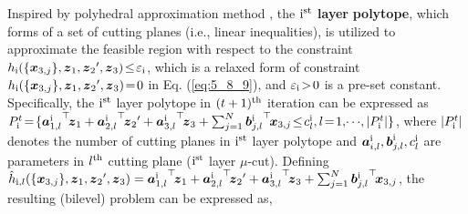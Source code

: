 \documentclass[letterpaper]{article} %
\begin{document}
Inspired by polyhedral approximation method \cite{bertsekas2015convex,burger2013polyhedral}, the \textbf{${\rm{\uppercase\expandafter{\romannumeral1}}}^{\rm{st}}$ layer} \textbf{polytope}, which forms of a set of cutting planes (i.e., linear inequalities), is utilized to approximate the feasible region with respect to the constraint $h_{\rm{\uppercase\expandafter{\romannumeral1}}}(\{{\boldsymbol{x}_{3,j}}\},\boldsymbol{z}_1, {\boldsymbol{z}_2}',\boldsymbol{z}_3 )\! \le \! \varepsilon_{\rm{\uppercase\expandafter{\romannumeral1}}}$, which is a relaxed form of constraint $h_{\rm{\uppercase\expandafter{\romannumeral1}}}(\{{\boldsymbol{x}_{3,j}}\},\boldsymbol{z}_1, {\boldsymbol{z}_2}',\boldsymbol{z}_3 )\!=\!0$ in Eq. (\ref{eq:5_8_9}), and $\varepsilon_{\rm{\uppercase\expandafter{\romannumeral1}}}\!>\!0$  is a pre-set constant. Specifically, the ${\rm{\uppercase\expandafter{\romannumeral1}}}^{\rm{st}}$ layer polytope in $(t+1)^{\rm{th}}$ iteration can be expressed as $P_{\rm{\uppercase\expandafter{\romannumeral1}}}^{t}\!=\!\{{\boldsymbol{a}_{1,l}^{\rm{\uppercase\expandafter{\romannumeral1}}}}^{\top}\!{\boldsymbol{z}_1} + {\boldsymbol{a}_{2,l}^{\rm{\uppercase\expandafter{\romannumeral1}}}}^{\top}\!{\boldsymbol{z}_2}' + {\boldsymbol{a}_{3,l}^{\rm{\uppercase\expandafter{\romannumeral1}}}}^{\top}\!{\boldsymbol{z}_3} + \sum\nolimits_{j = 1}^N {\boldsymbol{b}{{_{j,l}^{\rm{\uppercase\expandafter{\romannumeral1}}}}}}^{\top}\!{\boldsymbol{x}_{3,j}}  \!\le\! c_l^{\rm{\uppercase\expandafter{\romannumeral1}}},l \!=\! 1,\! \cdots\! ,|P_{\rm{\uppercase\expandafter{\romannumeral1}}}^{t}| \}$, where $|P_{\rm{\uppercase\expandafter{\romannumeral1}}}^{t}|$ denotes the number of cutting planes in ${\rm{\uppercase\expandafter{\romannumeral1}}}^{\rm{st}}$ layer polytope and ${\boldsymbol{a}_{i,l}^{\rm{\uppercase\expandafter{\romannumeral1}}}}, {\boldsymbol{b}_{j,l}^{\rm{\uppercase\expandafter{\romannumeral1}}}}, {c_{l}^{\rm{\uppercase\expandafter{\romannumeral1}}}}$ are parameters in $l^{\rm{th}}$ cutting plane (${\rm{\uppercase\expandafter{\romannumeral1}}}^{\rm{st}}$ layer $\mu$-cut). Defining $\hat{h}_{{\rm{\uppercase\expandafter{\romannumeral1}}},l}(\{{\boldsymbol{x}_{3,j}}\},\boldsymbol{z}_1, {\boldsymbol{z}_2}',\boldsymbol{z}_3 ) = {\boldsymbol{a}_{1,l}^{\rm{\uppercase\expandafter{\romannumeral1}}}}^{\top}\!{\boldsymbol{z}_1} + {\boldsymbol{a}_{2,l}^{\rm{\uppercase\expandafter{\romannumeral1}}}}^{\top}\!{\boldsymbol{z}_2}' + {\boldsymbol{a}_{3,l}^{\rm{\uppercase\expandafter{\romannumeral1}}}}^{\top}\!{\boldsymbol{z}_3} + \sum\nolimits_{j = 1}^N {\boldsymbol{b}{{_{j,l}^{\rm{\uppercase\expandafter{\romannumeral1}}}}}}^{\top}\!{\boldsymbol{x}_{3,j}} $, the resulting (bilevel) problem can be expressed as,
\end{document}
